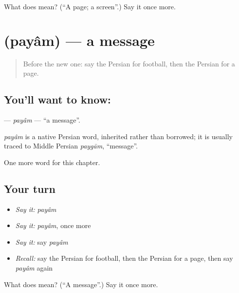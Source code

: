 \begin{tcolorbox}[breakable,colback=teal!4,colframe=teal!35!black,title={Before you move on}]
What does  mean? (\textquotedblleft{}A page; a screen\textquotedblright{}.) Say it once more.
\end{tcolorbox}
\section[\texorpdfstring{\fa{پیام} (payâm)}{پیام (payâm)}]{ (payâm) — a message}

\label{lesson:FA-C246-payam}



\begin{quote}
Before the new one: say the Persian for football, then the Persian for a page.
\end{quote}

\subsection*{You'll want to know: }
\textbf{} — \emph{payâm} — \textquotedblleft{}a message\textquotedblright{}.

\begin{cousinweb}
\emph{payâm} is a native Persian word, inherited rather than borrowed; it is usually traced to Middle Persian \emph{paygām}, \textquotedblleft{}message\textquotedblright{}.
\end{cousinweb}

\begin{grammarlens}[title={What you've built}]
One more word for this chapter.
\end{grammarlens}

\subsection*{Your turn}
\begin{itemize}
\raggedright
  \item \emph{Say it:} \emph{payâm}
  \item \emph{Say it:} \emph{payâm}, once more
  \item \emph{Say it:} say \emph{payâm}
  \item \emph{Recall:} say the Persian for football, then the Persian for a page, then say \emph{payâm} again
\end{itemize}

\begin{tcolorbox}[breakable,colback=teal!4,colframe=teal!35!black,title={Before you move on}]
What does  mean? (\textquotedblleft{}A message\textquotedblright{}.) Say it once more.
\end{tcolorbox}
